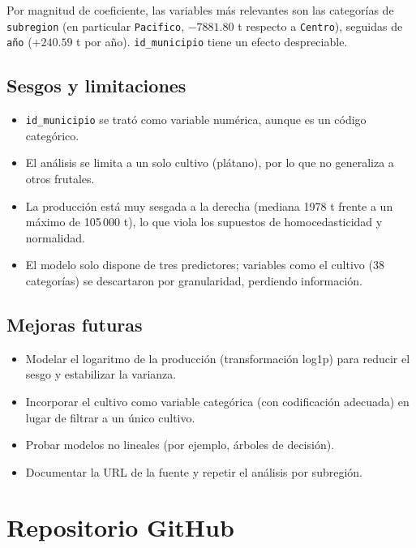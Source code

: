 \documentclass[11pt,a4paper]{article}
\begin{document}
Por magnitud de coeficiente, las variables más relevantes son las categorías de \texttt{subregion}
(en particular \texttt{Pacifico}, $-7881.80$ t respecto a \texttt{Centro}), seguidas de
\texttt{año} ($+240.59$ t por año). \texttt{id\_municipio} tiene un efecto despreciable.

\subsection{Sesgos y limitaciones}

\begin{itemize}
  \item \texttt{id\_municipio} se trató como variable numérica, aunque es un código categórico.
  \item El análisis se limita a un solo cultivo (plátano), por lo que no generaliza a otros frutales.
  \item La producción está muy sesgada a la derecha (mediana 1978 t frente a un máximo de
        105\,000 t), lo que viola los supuestos de homocedasticidad y normalidad.
  \item El modelo solo dispone de tres predictores; variables como el cultivo (38 categorías) se
        descartaron por granularidad, perdiendo información.
\end{itemize}

\subsection{Mejoras futuras}

\begin{itemize}
  \item Modelar el logaritmo de la producción (transformación log1p) para reducir el sesgo y
        estabilizar la varianza.
  \item Incorporar el cultivo como variable categórica (con codificación adecuada) en lugar de
        filtrar a un único cultivo.
  \item Probar modelos no lineales (por ejemplo, árboles de decisión).
  \item Documentar la URL de la fuente y repetir el análisis por subregión.
\end{itemize}

\section{Repositorio GitHub}
\end{document}
